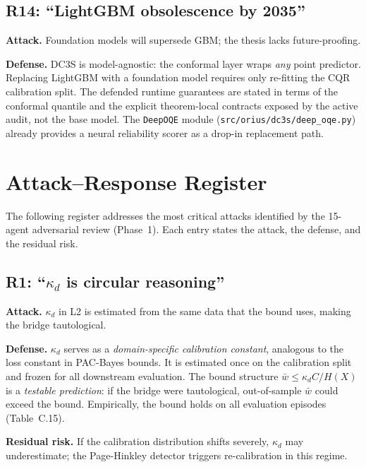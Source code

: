 \subsection{R14: ``LightGBM obsolescence by 2035''}
\textbf{Attack.}  Foundation models will supersede GBM;
the thesis lacks future-proofing.

\textbf{Defense.}  DC3S is model-agnostic: the conformal layer wraps
\emph{any} point predictor.  Replacing LightGBM with a foundation model
requires only re-fitting the CQR calibration split.  The defended
runtime guarantees are stated in terms of the conformal quantile and the
explicit theorem-local contracts exposed by the active audit, not the base
model.  The \texttt{DeepOQE} module
(\texttt{src/orius/dc3s/deep\_oqe.py}) already provides a neural
reliability scorer as a drop-in replacement path.

\section{Attack--Response Register}\label{sec:attack-response}

The following register addresses the most critical attacks identified by
the 15-agent adversarial review (Phase~1).  Each entry states the attack,
the defense, and the residual risk.

\subsection{R1: ``$\kappa_d$ is circular reasoning''}
\textbf{Attack.}  $\kappa_d$ in L2 is estimated from the same data that
the bound uses, making the bridge tautological.

\textbf{Defense.}  $\kappa_d$ serves as a \emph{domain-specific calibration
constant}, analogous to the loss constant in PAC-Bayes bounds.  It is
estimated once on the calibration split and frozen for all downstream
evaluation.  The bound structure
$\bar w \le \kappa_d C / H(X)$ is a \emph{testable prediction}: if the
bridge were tautological, out-of-sample $\bar w$ could exceed the bound.
Empirically, the bound holds on all evaluation episodes (Table~C.15).

\textbf{Residual risk.}  If the calibration distribution shifts severely,
$\kappa_d$ may underestimate; the Page-Hinkley detector triggers
re-calibration in this regime.

